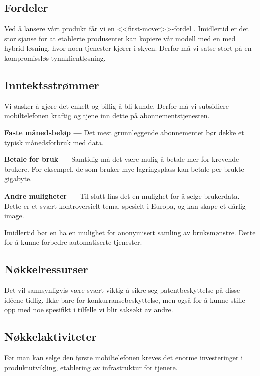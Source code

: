 \subsection{Fordeler}

Ved å lansere vårt produkt får vi en <<first-mover>>-fordel \cite{bessant}.
Imidlertid er det stor sjanse for at etablerte produsenter kan kopiere vår
modell med en med hybrid løsning, hvor noen tjenester kjører i skyen. Derfor må
vi satse stort på en kompromissløs tynnklientløsning.

\subsection{Inntektsstrømmer}

Vi ønsker å gjøre det enkelt og billig å bli kunde. Derfor må vi subsidiere
mobiltelefonen kraftig og tjene inn dette på abonnementstjenesten.

\textbf{Faste månedsbeløp --- }
Det mest grunnleggende abonnementet bør dekke et typisk månedsforbruk med data.

\textbf{Betale for bruk --- }
Samtidig må det være mulig å betale mer for krevende brukere. For eksempel, de
som bruker mye lagringsplass kan betale per brukte gigabyte.

\textbf{Andre muligheter --- }
Til slutt fins det en mulighet for å selge brukerdata. Dette er et svært
kontroversielt tema, spesielt i Europa, og kan skape et dårlig image.

Imidlertid bør en ha en mulighet for anonymisert samling av bruksmønstre. Dette
for å kunne forbedre automatiserte tjenester.

\subsection{Nøkkelressurser}

Det vil sannsynligvis være svært viktig å sikre seg patentbeskyttelse på disse
idéene tidlig. Ikke bare for konkurransebeskyttelse, men også for å kunne
stille opp med noe spesifikt i tilfelle vi blir saksøkt av andre.

\subsection{Nøkkelaktiviteter}

Før man kan selge den første mobiltelefonen kreves det enorme investeringer i
produktutvikling, etablering av infrastruktur for tjenere.

